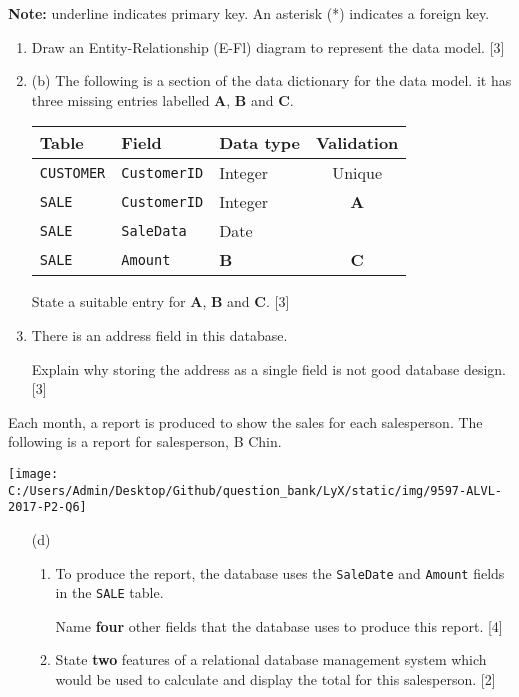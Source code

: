 \textbf{Note:} underline indicates primary key. An asterisk ({*})
indicates a foreign key. 
\begin{enumerate}
\item Draw an Entity-Relationship (E-Fl) diagram to represent the data model.
\hfill{} {[}3{]} 
\item (b) The following is a section of the data dictionary for the data
model. it has three missing entries labelled \textbf{A}, \textbf{B
}and \textbf{C}.
\begin{center}
\begin{tabular}{|l|l|l|c|}
\hline 
\texttt{\textbf{\hspace{0.01\columnwidth}}}\textbf{Table} & \texttt{\textbf{\hspace{0.01\columnwidth}}}\textbf{Field} & \textbf{Data type} & \textbf{Validation}\tabularnewline
\hline 
\texttt{CUSTOMER} & \texttt{CustomerID} & Integer & Unique\tabularnewline
\hline 
\texttt{SALE} & \texttt{CustomerID} & Integer & \textbf{A}\tabularnewline
\hline 
\texttt{SALE} & \texttt{SaleData} & Date & \tabularnewline
\hline 
\texttt{SALE} & \texttt{Amount} & \texttt{\textbf{\hspace{0.01\columnwidth}}}\textbf{B} & \textbf{C}\tabularnewline
\hline 
\end{tabular}
\par\end{center}

State a suitable entry for \textbf{A}, \textbf{B} and \textbf{C}.
\hfill{}{[}3{]} 
\item There is an address field in this database.

Explain why storing the address as a single field is not good database
design. \hfill{}{[}3{]}
\end{enumerate}
Each month, a report is produced to show the sales for each salesperson.
The following is a report for salesperson, B Chin. 
\begin{center}
\texttt{[image: C:/Users/Admin/Desktop/Github/question\_bank/LyX/static/img/9597-ALVL-2017-P2-Q6]}
\par\end{center}
\begin{enumerate}
\item[(d)] {}
\begin{enumerate}
\item To produce the report, the database uses the \texttt{SaleDate} and
\texttt{Amount} fields in the \texttt{SALE} table. 

Name \textbf{four }other fields that the database uses to produce
this report.\hfill{} {[}4{]}
\item State \textbf{two} features of a relational database management system
which would be used to calculate and display the total for this salesperson.\hfill{}
{[}2{]}
\end{enumerate}
\end{enumerate}